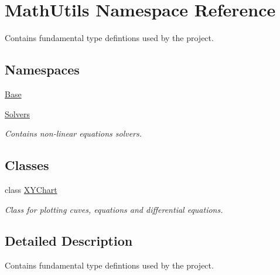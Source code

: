 \hypertarget{namespaceMathUtils}{\section{Math\-Utils Namespace Reference}
\label{namespaceMathUtils}
}


Contains fundamental type defintions used by the project.  


\subsection*{Namespaces}
\begin{DoxyCompactItemize}
\item 
\hyperlink{namespaceMathUtils_1_1Base}{Base}
\item 
\hyperlink{namespaceMathUtils_1_1Solvers}{Solvers}
\begin{DoxyCompactList}\small\item\em Contains non-\/linear equations solvers. \end{DoxyCompactList}\end{DoxyCompactItemize}
\subsection*{Classes}
\begin{DoxyCompactItemize}
\item 
class \hyperlink{classMathUtils_1_1XYChart}{X\-Y\-Chart}
\begin{DoxyCompactList}\small\item\em Class for plotting cuves, equations and differential equations. \end{DoxyCompactList}\end{DoxyCompactItemize}


\subsection{Detailed Description}
Contains fundamental type defintions used by the project. 